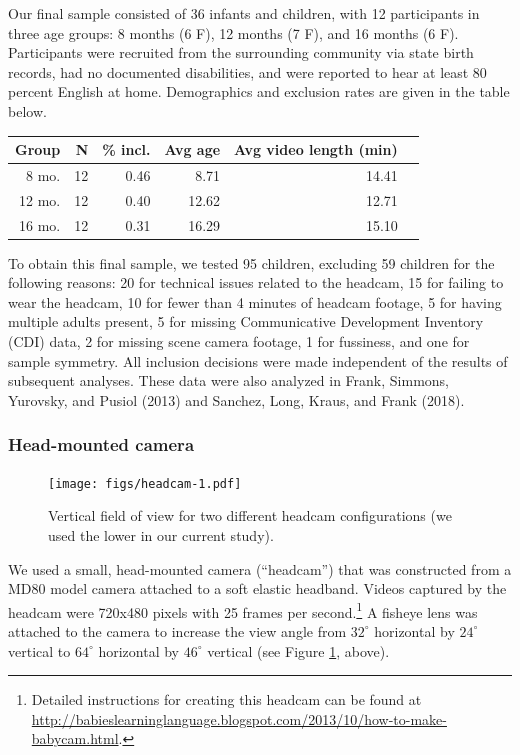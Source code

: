 \documentclass[english,man]{apa6}
\begin{document}
Our final sample consisted of 36 infants and children, with 12
participants in three age groups: 8 months (6 F), 12 months (7 F), and
16 months (6 F). Participants were recruited from the surrounding
community via state birth records, had no documented disabilities, and
were reported to hear at least 80 percent English at home. Demographics
and exclusion rates are given in the table below.

\begin{table}[ht]
\centering
\begin{tabular}{rrrrrr}
\hline
Group & N & \% incl. & Avg age & Avg video length (min) \\
\hline
8 mo. &   12 & 0.46 & 8.71 & 14.41 \\
12 mo. &  12 & 0.40 & 12.62 & 12.71 \\
16 mo. &  12 & 0.31 & 16.29 & 15.10\\
\hline
\end{tabular}
\end{table}

To obtain this final sample, we tested 95 children, excluding 59
children for the following reasons: 20 for technical issues related to
the headcam, 15 for failing to wear the headcam, 10 for fewer than 4
minutes of headcam footage, 5 for having multiple adults present, 5 for
missing Communicative Development Inventory (CDI) data, 2 for missing
scene camera footage, 1 for fussiness, and one for sample symmetry. All
inclusion decisions were made independent of the results of subsequent
analyses. These data were also analyzed in Frank, Simmons, Yurovsky, and
Pusiol (2013) and Sanchez, Long, Kraus, and Frank (2018).

\subsubsection{Head-mounted camera}\label{head-mounted-camera}

\begin{figure}[htbp]
\centering
\texttt{[image: figs/headcam-1.pdf]}
\caption{\label{fig:headcam}Vertical field of view for two different headcam
configurations (we used the lower in our current study).}
\end{figure}

We used a small, head-mounted camera (\enquote{headcam}) that was
constructed from a MD80 model camera attached to a soft elastic
headband. Videos captured by the headcam were 720x480 pixels with 25
frames per second.\footnote{Detailed instructions for creating this
  headcam can be found at
  \url{http://babieslearninglanguage.blogspot.com/2013/10/how-to-make-babycam.html}.}
A fisheye lens was attached to the camera to increase the view angle
from \(32^{\circ}\) horizontal by \(24^{\circ}\) vertical to
\(64^{\circ}\) horizontal by \(46^{\circ}\) vertical (see Figure
\ref{fig:headcam}, above).
\end{document}

